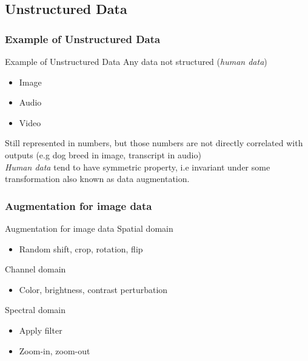 \subsection{Unstructured Data}

\subsubsection{Example of Unstructured Data}
\begin{frame}{Example of Unstructured Data}
Any data not structured (\emph{human data})

\begin{itemize}
    \item Image
    \item Audio
    \item Video
\end{itemize}
Still represented in numbers, but those numbers are not directly correlated with outputs (e.g dog breed in image, transcript in audio) \\
\emph{Human data} tend to have symmetric property, i.e invariant under some transformation also known as data augmentation.

\end{frame}

\subsubsection{Augmentation for image data}
\begin{frame}{Augmentation for image data}
    Spatial domain
    \begin{itemize}
        \item Random shift, crop, rotation, flip
    \end{itemize}
    Channel domain
    \begin{itemize}
        \item Color, brightness, contrast perturbation
    \end{itemize}
    Spectral domain
    \begin{itemize}
        \item Apply filter
        \item Zoom-in, zoom-out
    \end{itemize}
\end{frame}

